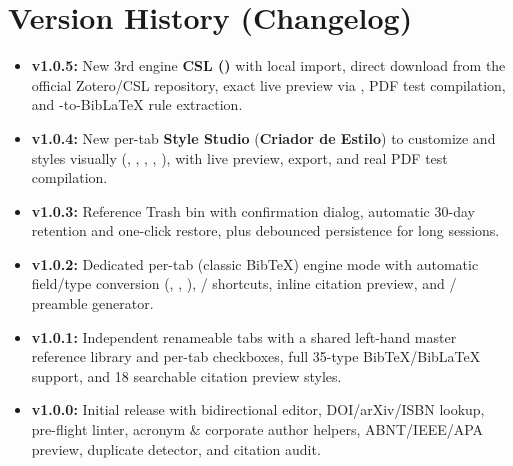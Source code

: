 \documentclass[11pt,a4paper]{article}
\begin{document}
\section{Version History (Changelog)}
\begin{itemize}
  \item \textbf{v1.0.5:} New 3rd engine \textbf{CSL ()} with local  import, direct download from the official Zotero/CSL repository, exact live preview via , PDF test compilation, and -to-BibLaTeX rule extraction.
  \item \textbf{v1.0.4:} New per-tab \textbf{Style Studio} (\textbf{Criador de Estilo}) to customize  and  styles visually (, , , , ), with live preview,  export, and real PDF test compilation.
  \item \textbf{v1.0.3:} Reference Trash bin with confirmation dialog, automatic 30-day retention and one-click restore, plus debounced persistence for long sessions.
  \item \textbf{v1.0.2:} Dedicated per-tab  (classic BibTeX) engine mode with automatic field/type conversion (, , ), / shortcuts, inline citation preview, and / preamble generator.
  \item \textbf{v1.0.1:} Independent renameable tabs with a shared left-hand master reference library and per-tab checkboxes, full 35-type BibTeX/BibLaTeX  support, and 18 searchable citation preview styles.
  \item \textbf{v1.0.0:} Initial release with bidirectional  editor, DOI/arXiv/ISBN lookup, pre-flight linter, acronym & corporate author helpers, ABNT/IEEE/APA preview, duplicate detector, and  citation audit.
\end{itemize}
\end{document}
